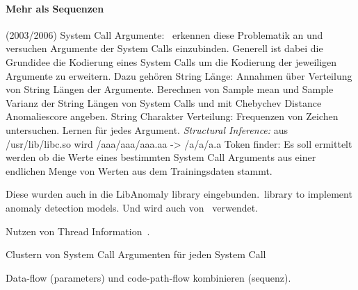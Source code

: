     \paragraph{Mehr als Sequenzen}

        (2003/2006) System Call Argumente:~\cite{ARGUMENTS, ARGUMENTS2} erkennen diese Problematik an und versuchen Argumente der System Calls einzubinden.
        Generell ist dabei die Grundidee die Kodierung eines System Calls um die Kodierung der jeweiligen Argumente zu erweitern.
        Dazu gehören String Länge: Annahmen über Verteilung von String Längen der Argumente. 
            Berechnen von Sample mean und Sample Varianz der String Längen von System Calls und mit Chebychev Distance Anomaliescore angeben.
        String Charakter Verteilung: Frequenzen von Zeichen untersuchen. Lernen für jedes Argument.
        \textit{Structural Inference:} aus /usr/lib/libc.so wird /aaa/aaa/aaa.aa -> /a/a/a.a  
        Token finder: Es soll ermittelt werden ob die Werte eines bestimmten System Call Arguments aus einer endlichen Menge von Werten aus dem Trainingsdaten stammt.
        
        Diese wurden auch in die LibAnomaly library eingebunden.\
        library to implement anomaly detection models.
        Und wird auch von~\cite{MAGGI} verwendet.

        Nutzen von Thread Information~\cite{IDSTHREADGRIMMER2021}.

        Clustern von System Call Argumenten für jeden System Call~\cite{}

        Data-flow (parameters) und code-path-flow kombinieren (sequenz).


